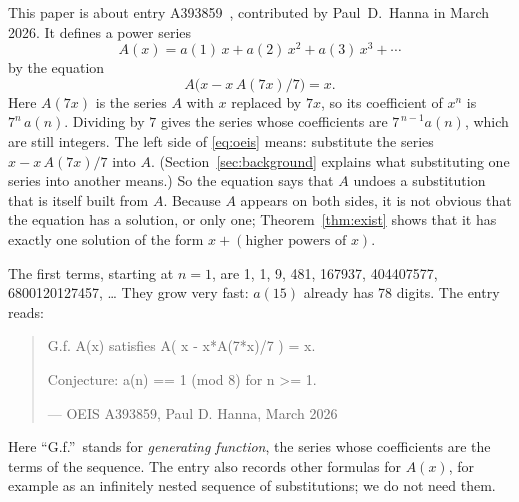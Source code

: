\documentclass[11pt,a4paper]{article}
\theoremstyle{definition}
\theoremstyle{remark}
\begin{document}
This paper is about entry A393859~\cite{oeis}, contributed by Paul~D.~Hanna in March 2026. It defines a power series
\[
A(x)=a(1)\,x+a(2)\,x^2+a(3)\,x^3+\cdots
\]
by the equation
\begin{equation}\label{eq:oeis}
A\bigl(x-x\,A(7x)/7\bigr)=x.
\end{equation}
Here $A(7x)$ is the series $A$ with $x$ replaced by $7x$, so its coefficient of $x^n$ is
$7^n\,a(n)$. Dividing by $7$ gives the series whose coefficients are
$7^{\,n-1}a(n)$, which are still integers. The left side of \eqref{eq:oeis} means: substitute the series
$x-x\,A(7x)/7$ into $A$. (Section~\ref{sec:background} explains what substituting one
series into another means.) So the equation says that $A$ undoes a substitution that is itself built from $A$. Because
$A$ appears on both sides, it is not obvious that the equation has a solution, or only one; Theorem~\ref{thm:exist}
shows that it has exactly one solution of the form $x+(\text{higher powers of }x)$.

The first terms, starting at $n=1$, are 1, 1, 9, 481, 167937, 404407577, 6800120127457, \dots{} They grow very fast: $a(15)$
already has 78 digits. The entry reads:
\begin{quote}\small\ttfamily\raggedright G.f. A(x) satisfies A( x - x*A(7*x)/7 ) = x.\par\smallskip Conjecture: a(n) == 1 (mod 8) for n >= 1.\par\smallskip\hfill\textrm{--- OEIS A393859, Paul D. Hanna, March 2026}\end{quote}

Here ``G.f.''\ stands for \emph{generating function}, the series whose coefficients are the terms of the sequence.
The entry also records other formulas for $A(x)$, for example as an infinitely nested sequence of substitutions; we do
not need them.
\end{document}
